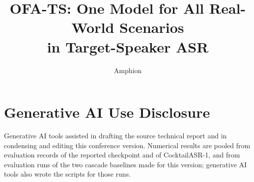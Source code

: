 \documentclass{Interspeech}
\title{OFA-TS: One Model for All Real-World Scenarios\\in Target-Speaker ASR}
\author{Amphion}{Team}
\begin{document}
\maketitle
\begin{abstract}

\end{abstract}





\section{Generative AI Use Disclosure}
Generative AI tools assisted in drafting the source technical report and in condensing and editing this conference version. Numerical results are pooled from evaluation records of the reported checkpoint and of CocktailASR-1, and from evaluation runs of the two cascade baselines made for this version; generative AI tools also wrote the scripts for those runs.


\end{document}
